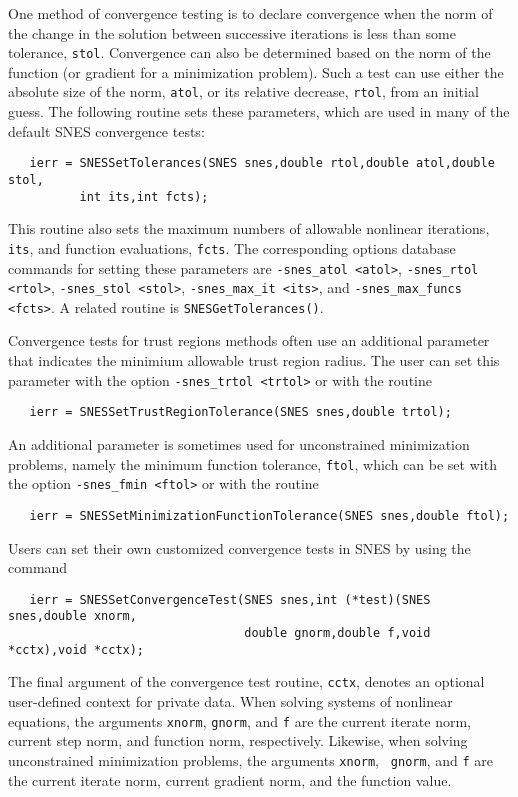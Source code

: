 One method of convergence testing is
to declare convergence when the norm of the change in the solution
between successive iterations is less than some tolerance, {\tt stol}.
Convergence can also be determined based on the norm of the function
(or gradient for a minimization problem).  
Such a test can use either the absolute size of the
norm, {\tt atol}, or its relative decrease, {\tt rtol}, from an initial
guess.  The following routine sets these parameters, which are used
in many of the default SNES convergence tests: 
\begin{verbatim}
   ierr = SNESSetTolerances(SNES snes,double rtol,double atol,double stol,
          int its,int fcts);
\end{verbatim}
This routine also sets the maximum numbers of allowable
nonlinear iterations, {\tt its}, and function evaluations, {\tt fcts}.
The corresponding options database commands for setting these parameters
are {\tt -snes\_atol <atol>}, {\tt -snes\_rtol <rtol>}, {\tt -snes\_stol <stol>},
   
 
{\tt -snes\_max\_it <its>}, and {\tt -snes\_max\_funcs <fcts>}.
A related routine is {\tt SNESGetTolerances()}. 

Convergence tests for trust regions methods often use an additional
parameter that indicates the minimium allowable trust region radius.
The user can set this parameter with the option {\tt -snes\_trtol <trtol>}
 or with the routine
\begin{verbatim}
   ierr = SNESSetTrustRegionTolerance(SNES snes,double trtol);
\end{verbatim}
An additional parameter is sometimes used for unconstrained minimization
problems, namely the minimum function tolerance, {\tt ftol}, which can
be set with the option {\tt -snes\_fmin <ftol>}  or
with the routine
\begin{verbatim}
   ierr = SNESSetMinimizationFunctionTolerance(SNES snes,double ftol);
\end{verbatim}

Users can set their own customized convergence tests in SNES by using
the command 
\begin{verbatim}
   ierr = SNESSetConvergenceTest(SNES snes,int (*test)(SNES snes,double xnorm,
                                 double gnorm,double f,void *cctx),void *cctx);
\end{verbatim}
The final argument of the convergence test routine, {\tt cctx},
denotes an optional user-defined context for private data.  When
solving systems of nonlinear equations, the arguments {\tt xnorm},
{\tt gnorm}, and {\tt f} are the current iterate norm, current step
norm, and function norm, respectively.  Likewise, when solving
unconstrained minimization problems, the arguments {\tt xnorm}, {\tt
gnorm}, and {\tt f} are the current iterate norm, current gradient
norm, and the function value.

